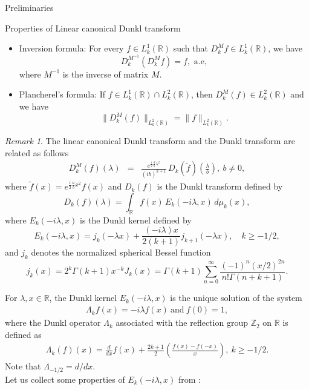 \documentclass[12pt,a4paper,reqno]{amsproc}
\theoremstyle{definition}
\theoremstyle{remark}
\newtheorem{remark}[theorem]{Remark}
\numberwithin{equation}{section}
\begin{document}
\begin{section}{Preliminaries}
\begin{subsection}{ Properties of Linear 
canonical Dunkl transform}
\begin{itemize}
\item[$(i)$]  Inversion formula: For every $ f\in L^1_{k}(\mathbb{R})$ such that $D^M_{k}f \in L^1_{k}(\mathbb{R})$,  we have
\begin{equation*}\label{e:2.2}
D^{M^{-1}}_{k} (D^M_{k}f)
=f ,\,\, \text{a.e},    
\end{equation*}
where $M^{-1}$ is the inverse of matrix $M$.
\item[$(ii)$] Plancherel's formula:
If $f \in  L^{1}_{k}(\mathbb{R})\cap L^{2}_{k}(\mathbb{R}) $, then  $D^M_k(f) \in L^{2}_{k}(\mathbb{R})$ and we have 
 \begin{equation} \label{e:2.3}
 \|D^M_k(f)\|_{ L^{2}_{k}(\mathbb{R})} = \| f \|_{ L^{2}_{k}(\mathbb{R})}.
 \end{equation}
\end{itemize}
\begin{remark} 
The linear canonical Dunkl transform and the Dunkl transform are related as follows
\begin{eqnarray} \label{eq:4.2}
 D_k^M(f)(\lambda) 
 &=& \frac{e^{\frac{i}{2}\frac{d}{b}\lambda^2}}{(ib)^{k+1}}\, D_k(\tilde{f})\left(\frac{\lambda}{b}\right),~b\neq 0,
\end{eqnarray}
where $\tilde{f}(x) =  e^{\frac{i}{2}\frac{a}{b}x^2}f(x)$ and $D_k(f)$ is the Dunkl transform \cite{de1993dunkl, rosler1998generalized} defined by 
\begin{equation*}
  D_k(f)(\lambda) = \int_{\mathbb{R}} f(x)\, E_k(-i\lambda,x)\,d\mu_k(x),
\end{equation*}
where  $ E_k(-i\lambda,x)$ is the Dunkl kernel \cite{rosler2003positive, rosler2003dunkl}
defined by
 \begin{equation*}
  E_k(-i\lambda,x) = j_{k}(-\lambda x)+\frac{(-i\lambda) x}{2(k+1)}j_{k+1}(-\lambda x), \quad k\ge -1/2,\end{equation*}
and $j_{k}$  denotes the normalized spherical Bessel function 
 \begin{equation*}
 j_{k}(x) = 2^{k} \Gamma(k+1)x^{-k}J_{k}(x) = \Gamma(k +1)\sum^{\infty}_{n=0}\frac{(-1)^n(x/2)^{2n}}{n!\Gamma(n+k+1)}.
\end{equation*}
\end{remark} 
For $\lambda,x\in\mathbb{R}$, the Dunkl kernel $E_k(-i\lambda, x)$ is the unique solution of the system
\begin{eqnarray*}
    \Lambda_k f(x)=-i\lambda f(x) ~\text{and} ~f(0)=1,
\end{eqnarray*}
where the Dunkl operator $\Lambda_k$ associated with the reflection group $\mathbb{Z}_2$ on $\mathbb{R}$ is defined as
\begin{eqnarray*}
    \Lambda_k(f)(x)=\frac{d}{dx}f(x)+\frac{2k+1}{2}\left(\frac{f(x)-f(-x)}{x}\right), ~k\geq -1/2.
\end{eqnarray*}
Note that $\Lambda_{-1/2}=d/dx$.
\\
Let us collect some properties of $E_k(-i\lambda,x)$ from \cite{rosler2003positive,  trimeche2001dunkel}:


\end{subsection}
\end{section}
\end{document}
